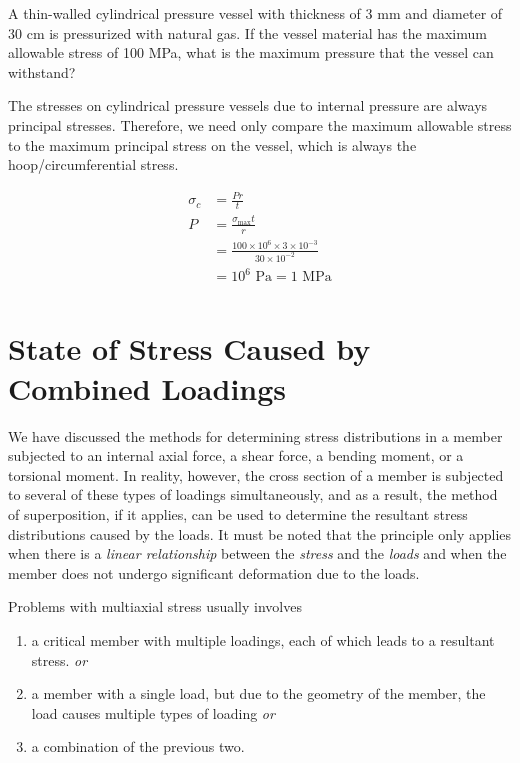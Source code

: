 \documentclass[
10pt,
a4paper,
openany,
svgnames,
]{book} %
\begin{document}
\begin{example}
A thin-walled cylindrical pressure vessel with thickness of 3 mm and diameter of 30 cm is pressurized with natural gas. If the vessel material has the maximum allowable stress of 100 MPa, what is the maximum pressure that the vessel can withstand?
\end{example}
\begin{solution}
The stresses on cylindrical pressure vessels due to internal pressure are always principal stresses. Therefore, we need only compare the maximum allowable stress to the maximum principal stress on the vessel, which is always the hoop/circumferential stress.

\begin{align*}
  {\sigma _c} &= \frac{{Pr}}{t} \\ 
  P &= \frac{{{\sigma _{\max }}t}}{r} \\ 
              &= \frac{{100 \times {{10}^6} \times 3 \times {{10}^{ - 3}}}}{{30 \times {{10}^{ - 2}}}} \\ 
              &= {10^6} \text{ Pa} = 1\text{ MPa} \\ 
\end{align*}

\end{solution}
\section{State of Stress Caused by Combined Loadings}

We have discussed the methods for determining stress distributions in a member subjected to an internal axial force, a shear force, a bending moment, or a torsional moment. In reality, however, the cross section of a member is subjected to several of these types of loadings simultaneously, and as a result, the method of superposition, if it applies, can be used to determine the resultant stress distributions caused by the loads. It must be noted that the principle only applies when there is a \emph{linear relationship} between the \emph{stress} and the \emph{loads} and when the member does not undergo significant deformation due to the loads.

Problems with multiaxial stress usually involves
\begin{enumerate}
\item a critical member with multiple loadings, each of which leads to a resultant stress. \emph{or}
\item a member with a single load, but due to the geometry of the member, the load causes multiple types of loading \emph{or}
\item a combination of the previous two.
\end{enumerate}
\end{document}
